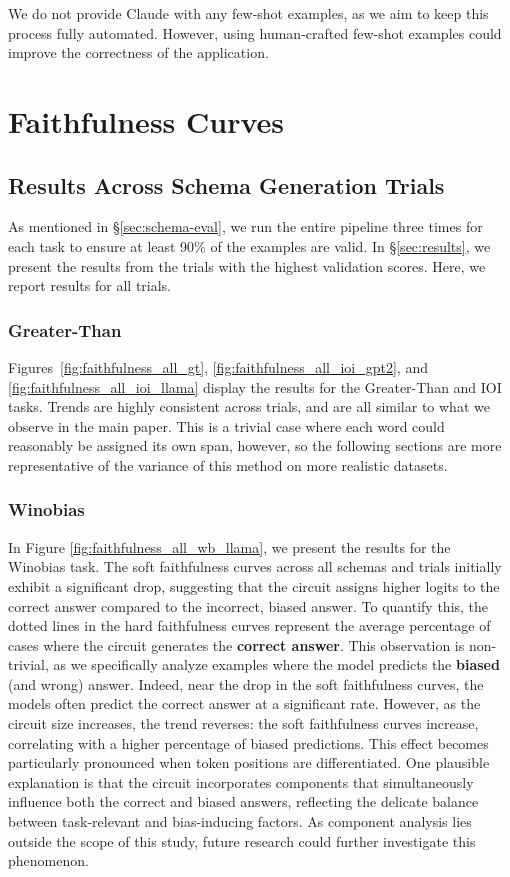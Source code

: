 We do not provide Claude with any few-shot examples, as we aim to keep this process fully automated. However, using human-crafted few-shot examples could improve the correctness of the application.



\section{Faithfulness Curves}\label{ap:faithfulness_curves}
\subsection{Results Across Schema Generation Trials}\label{ap:faitfulness-trials}
As mentioned in \S\ref{sec:schema-eval}, we run the entire pipeline three times for each task to ensure at least 90\% of the examples are valid. In \S\ref{sec:results}, we present the results from the trials with the highest validation scores. Here, we report results for all trials. 

\subsubsection{Greater-Than}
Figures~\ref{fig:faithfulness_all_gt}, \ref{fig:faithfulness_all_ioi_gpt2}, and \ref{fig:faithfulness_all_ioi_llama} display the results for the Greater-Than and IOI tasks. Trends are highly consistent across trials, and are all similar to what we observe in the main paper. This is a trivial case where each word could reasonably be assigned its own span, however, so the following sections are more representative of the variance of this method on more realistic datasets.

\subsubsection{Winobias}
\label{ap:faithfulness_curves_wb}

In Figure \ref{fig:faithfulness_all_wb_llama}, we present the results for the Winobias task. The soft faithfulness curves across all schemas and trials initially exhibit a significant drop, suggesting that the circuit assigns higher logits to the correct answer compared to the incorrect, biased answer. To quantify this, the dotted lines in the hard faithfulness curves represent the average percentage of cases where the circuit generates the \textbf{correct answer}. This observation is non-trivial, as we specifically analyze examples where the model predicts the \textbf{biased} (and wrong) answer. Indeed, near the drop in the soft faithfulness curves, the models often predict the correct answer at a significant rate. However, as the circuit size increases, the trend reverses: the soft faithfulness curves increase, correlating with a higher percentage of biased predictions.
This effect becomes particularly pronounced when token positions are differentiated. One plausible explanation is that the circuit incorporates components that simultaneously influence both the correct and biased answers, reflecting the delicate balance between task-relevant and bias-inducing factors. As component analysis lies outside the scope of this study, future research could further investigate this phenomenon.

